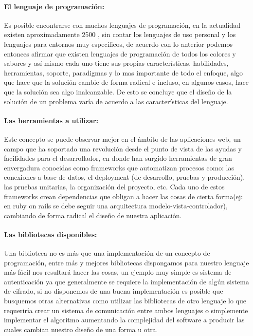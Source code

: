 \paragraph{El lenguaje de programación:}
Es posible encontrarse con muchos lenguajes de programación, en la actualidad existen aproximadamente 2500 \cite{bd_lenguajes_programacion}, sin contar los lenguajes de uso personal y los lenguajes para entornos muy específicos, de acuerdo con lo anterior podemos entonces afirmar que existen lenguajes de programación de todos los colores y sabores y así mismo cada uno tiene sus propias características, habilidades, herramientas, soporte, paradigmas y lo mas importante de todo el enfoque, algo que hace que la solución cambie de forma radical e incluso, en algunos casos, hace que la solución sea algo inalcanzable. \newline De esto se concluye que el diseño de la solución de un problema varía de acuerdo a las características del lenguaje.

\paragraph{Las herramientas a utilizar:}
Este concepto se puede observar mejor en el ámbito de las aplicaciones web, un campo que ha soportado una revolución desde el punto de vista de las ayudas y facilidades para el desarrollador, en donde han surgido herramientas de gran envergadura conocidas como frameworks que automatizan procesos como: las conexiones a base de datos, el deployment (de desarrollo, pruebas y producción), las pruebas unitarias, la organización del proyecto, etc. Cada uno de estos frameworks crean dependencias que obligan a hacer las cosas de cierta forma(ej: en ruby on rails se debe seguir una arquitectura modelo-vista-controlador), cambiando de forma radical el diseño de nuestra aplicación.

\paragraph{Las bibliotecas disponibles:}
Una biblioteca no es más que una implementación de un concepto de programación, entre más y mejores bibliotecas dispongamos para nuestro lenguaje más fácil nos resultará hacer las cosas, un ejemplo muy simple es sistema de autenticación ya que generalmente se requiere la implementación de algún sistema de cifrado, si no disponemos de una buena implementación es posible que busquemos otras alternativas como utilizar las bibliotecas de otro lenguaje lo que requeriría crear un sistema de comunicación entre ambos lenguajes o simplemente implementar el algoritmo aumentando la complejidad del software a producir las cuales cambian nuestro diseño de una forma u otra.

